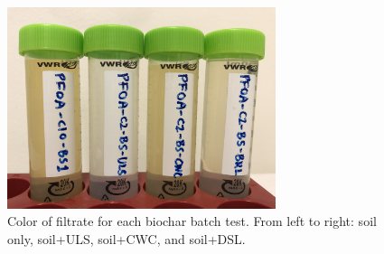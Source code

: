 \begin{figure}
    \centering
    \includegraphics[width=0.7\textwidth]{Bilder/Samples/Filtrate_DOC.JPG}
    \caption{Color of filtrate for each biochar batch test. From left to right: soil only, soil+ULS, soil+CWC, and soil+DSL.}
    \label{fig:DOC}
\end{figure}

\begin{table}
    \caption{Spike concentrations (SC) in \textmu g L\textsuperscript{-1} used for the batch tests, corrected for the analytical standards. MIX = cocktail spike concentration for biochar-water batch tests in triplicates, MIX-S = cocktail spike concentration for biochar-soil-water and soil-water batch tests.}
    \label{tab:spikeConcentrations}
\end{table}

